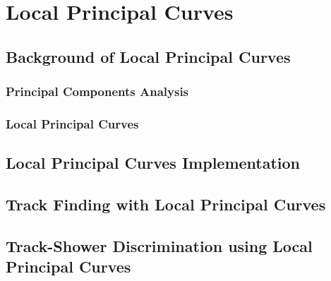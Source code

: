 \chapter{Local Principal Curves}

\section{Background of Local Principal Curves} 
\subsection{Principal Components Analysis}
\subsection{Local Principal Curves}

\section{Local Principal Curves Implementation}

\section{Track Finding with Local Principal Curves}

\section{Track-Shower Discrimination using Local Principal Curves}
